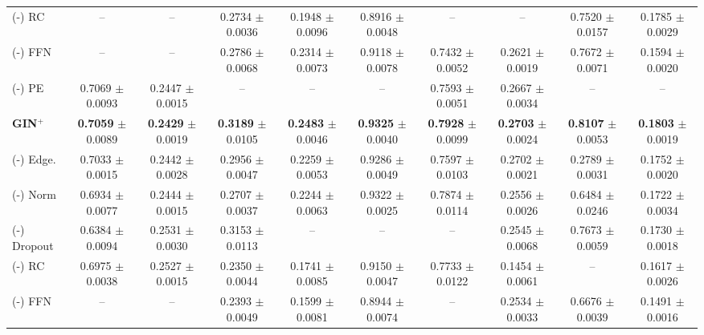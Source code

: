 \begin{table*}[t]
{\begin{tabular}{l|ccccccccc}
        (-) RC & – & – & 0.2734{\tiny{ $\pm$ 0.0036}} & 0.1948{\tiny{ $\pm$ 0.0096}} & 0.8916{\tiny{ $\pm$ 0.0048}} & – & – & 0.7520{\tiny{ $\pm$ 0.0157}} & 0.1785{\tiny{ $\pm$ 0.0029}} \\ 
        (-) FFN & – & – & 0.2786{\tiny{ $\pm$ 0.0068}} & 0.2314{\tiny{ $\pm$ 0.0073}} & 0.9118{\tiny{ $\pm$ 0.0078}} & 0.7432{\tiny{ $\pm$ 0.0052}} & 0.2621{\tiny{ $\pm$ 0.0019}} & 0.7672{\tiny{ $\pm$ 0.0071}} & 0.1594{\tiny{ $\pm$ 0.0020}} \\ 
        (-) PE & 0.7069{\tiny{ $\pm$ 0.0093}} & 0.2447{\tiny{ $\pm$ 0.0015}} & – & – & – & 0.7593{\tiny{ $\pm$ 0.0051}} & 0.2667{\tiny{ $\pm$ 0.0034}} &  – & – \\ 
        \midrule %
         \textbf{GIN$^+$} & \textbf{0.7059}{\tiny{ $\pm$ 0.0089}} & \textbf{0.2429}{\tiny{ $\pm$ 0.0019}} & \textbf{0.3189}{\tiny{ $\pm$ 0.0105}} & \textbf{0.2483}{\tiny{ $\pm$ 0.0046}} & \textbf{0.9325}{\tiny{ $\pm$ 0.0040}} & \textbf{0.7928}{\tiny{ $\pm$ 0.0099 }} & \textbf{0.2703}{\tiny{ $\pm$ 0.0024}} & \textbf{0.8107}{\tiny{ $\pm$ 0.0053}} & \textbf{0.1803}{\tiny{ $\pm$ 0.0019}}  \\
         (-) Edge. & 0.7033{\tiny{ $\pm$ 0.0015}} & 0.2442{\tiny{ $\pm$ 0.0028}} & 0.2956{\tiny{ $\pm$ 0.0047}} & 0.2259{\tiny{ $\pm$ 0.0053}} & 0.9286{\tiny{ $\pm$ 0.0049}} & 0.7597{\tiny{ $\pm$ 0.0103 }} & 0.2702{\tiny{ $\pm$ 0.0021}} & 0.2789{\tiny{ $\pm$ 0.0031}} & 0.1752{\tiny{ $\pm$ 0.0020}}  \\
        (-) Norm & 0.6934{\tiny{ $\pm$ 0.0077}} & 0.2444{\tiny{ $\pm$ 0.0015}} & 0.2707{\tiny{ $\pm$ 0.0037}} & 0.2244{\tiny{ $\pm$ 0.0063}} & 0.9322{\tiny{ $\pm$ 0.0025}} & 0.7874{\tiny{ $\pm$ 0.0114 }} & 0.2556{\tiny{ $\pm$ 0.0026}} & 0.6484{\tiny{ $\pm$ 0.0246}} & 0.1722{\tiny{ $\pm$ 0.0034}}  \\
         (-) Dropout & 0.6384{\tiny{ $\pm$ 0.0094}} & 0.2531{\tiny{ $\pm$ 0.0030}} & 0.3153{\tiny{ $\pm$ 0.0113}} & – & – & – & 0.2545{\tiny{ $\pm$ 0.0068}} & 0.7673{\tiny{ $\pm$ 0.0059}} & 0.1730{\tiny{ $\pm$ 0.0018}}  \\
         (-) RC & 0.6975{\tiny{ $\pm$ 0.0038}} & 0.2527{\tiny{ $\pm$ 0.0015}} & 0.2350{\tiny{ $\pm$ 0.0044}} & 0.1741{\tiny{ $\pm$ 0.0085}} & 0.9150{\tiny{ $\pm$ 0.0047}} & 0.7733{\tiny{ $\pm$ 0.0122 }} & 0.1454{\tiny{ $\pm$ 0.0061}} & – & 0.1617{\tiny{ $\pm$ 0.0026}}  \\
        (-) FFN & – & – & 0.2393{\tiny{ $\pm$ 0.0049}} & 0.1599{\tiny{ $\pm$ 0.0081}} & 0.8944{\tiny{ $\pm$ 0.0074}} & – & 0.2534{\tiny{ $\pm$ 0.0033}} & 0.6676{\tiny{ $\pm$ 0.0039}} & 0.1491{\tiny{ $\pm$ 0.0016}}  \\

\end{tabular}}
\end{table*}
